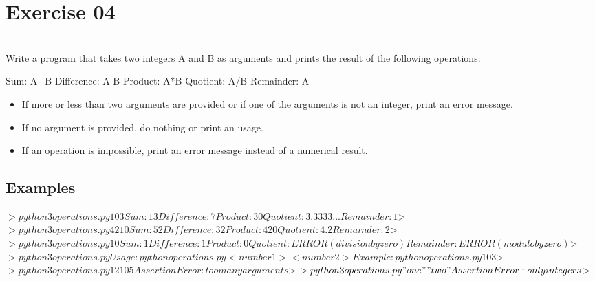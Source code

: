 \chapter{Exercise 04}
\makeheaderfilesforbidden\\
Write a program that takes two integers A and B as arguments and prints the result of the following operations:
\newline
\begin{42console}
Sum:         	A+B
Difference: 	A-B
Product:     	A*B
Quotient:    	A/B
Remainder:   	A%
\end{42console}

\begin{itemize}
	\item If more or less than two arguments are provided or if one of the arguments is not an integer, print an error message.
	\item If no argument is provided, do nothing or print an usage.
	\item If an operation is impossible, print an error message instead of a numerical result.
\end{itemize}

\section*{Examples}
\begin{42console}
$> python3 operations.py 10 3
Sum:         13
Difference:  7
Product:     30
Quotient:    3.3333...
Remainder:   1
$>
$> python3 operations.py 42 10
Sum:         52
Difference:  32
Product:     420
Quotient:    4.2
Remainder:   2
$>
$> python3 operations.py 1 0
Sum:         1
Difference:  1
Product:     0
Quotient:    ERROR (division by zero)
Remainder:   ERROR (modulo by zero)
$>
$> python3 operations.py
Usage: python operations.py <number1> <number2>
Example:
	python operations.py 10 3
$>
$> python3 operations.py 12 10 5
AssertionError: too many arguments
$>
$> python3 operations.py "one" "two"
AssertionError: only integers
$>
\end{42console}

